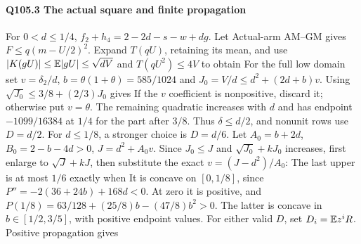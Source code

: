 \paragraph{Q105.3 The actual square and finite propagation}\label{part:Q105.3}
For $0<\allowbreak d\le\allowbreak 1/4$, $f_2+h_4=\allowbreak 2-2d-s-w+dg$.
Let
Actual-arm AM--GM gives $F\le\allowbreak  q(m-U/2)^2$.
Expand $T(qU)$, retaining its mean, and use
$|K(gU)|\le\allowbreak \mathbb E|gU|\le\allowbreak \sqrt{dV}$ and $T(qU^2)\le\allowbreak 4V$ to obtain
For the full low domain set $v=\allowbreak \delta_2/d$,
$b=\allowbreak \theta(1+\theta)=\allowbreak 585/1024$ and
$J_0=\allowbreak V/d\le\allowbreak  d^2+(2d+b)v$. Using $\sqrt{J_0}\le\allowbreak 3/8+(2/3)J_0$ gives
If the $v$ coefficient is nonpositive, discard it; otherwise put
$v=\allowbreak \theta$. The remaining quadratic increases with $d$ and has endpoint
$-1099/16384$ at $1/4$ for the part after $3/8$.
Thus $\delta\le\allowbreak  d/2$, and nonunit rows use $D=\allowbreak d/2$.
For $d\le\allowbreak 1/8$, a stronger choice is $D=\allowbreak d/6$.
Let $A_0=\allowbreak b+2d$, $B_0=\allowbreak 2-b-4d>\allowbreak 0$, $J=\allowbreak d^2+A_0v$.
Since $J_0\le\allowbreak  J$ and $\sqrt{J_0}+kJ_0$ increases, first enlarge to
$\sqrt J+kJ$, then substitute the exact $v=\allowbreak (J-d^2)/A_0$:
The last upper is at most $1/6$ exactly when
It is concave on $[0,\allowbreak 1/8]$, since $P''=\allowbreak -2(36+24b)+168d<\allowbreak 0$.
At zero it is positive, and
$P(1/8)=\allowbreak 63/128+(25/8)b-(47/8)b^2>\allowbreak 0$.
The latter is concave in $b\in[1/2,\allowbreak 3/5]$, with positive endpoint values.
For either valid $D$, set $D_i=\allowbreak \mathbb E z^iR$.
Positive propagation gives
